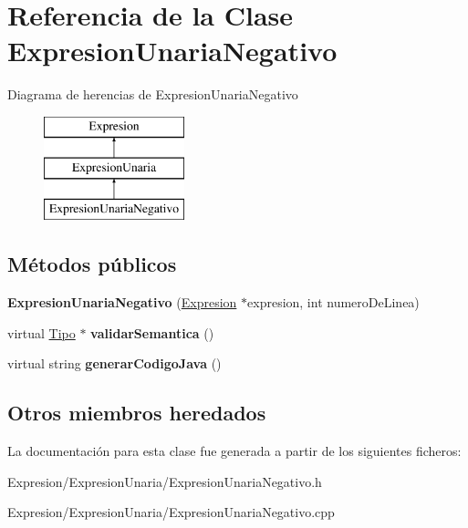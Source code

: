 \hypertarget{class_expresion_unaria_negativo}{\section{Referencia de la Clase Expresion\-Unaria\-Negativo}
\label{class_expresion_unaria_negativo}
}
Diagrama de herencias de Expresion\-Unaria\-Negativo\begin{figure}[H]
\begin{center}
\leavevmode
\includegraphics[height=3.000000cm]{class_expresion_unaria_negativo}
\end{center}
\end{figure}
\subsection*{Métodos públicos}
\begin{DoxyCompactItemize}
\item 
\hypertarget{class_expresion_unaria_negativo_a897ba7b63c8c8d6d7c5794a27dcb322b}{{\bfseries Expresion\-Unaria\-Negativo} (\hyperlink{class_expresion}{Expresion} $\ast$expresion, int numero\-De\-Linea)}\label{class_expresion_unaria_negativo_a897ba7b63c8c8d6d7c5794a27dcb322b}

\item 
\hypertarget{class_expresion_unaria_negativo_a876ebfb1a2ac9546a696078b6a18381c}{virtual \hyperlink{class_tipo}{Tipo} $\ast$ {\bfseries validar\-Semantica} ()}\label{class_expresion_unaria_negativo_a876ebfb1a2ac9546a696078b6a18381c}

\item 
\hypertarget{class_expresion_unaria_negativo_a0bfb774ec66fda7bfcb88f403026265e}{virtual string {\bfseries generar\-Codigo\-Java} ()}\label{class_expresion_unaria_negativo_a0bfb774ec66fda7bfcb88f403026265e}

\end{DoxyCompactItemize}
\subsection*{Otros miembros heredados}


La documentación para esta clase fue generada a partir de los siguientes ficheros\-:\begin{DoxyCompactItemize}
\item 
Expresion/\-Expresion\-Unaria/Expresion\-Unaria\-Negativo.\-h\item 
Expresion/\-Expresion\-Unaria/Expresion\-Unaria\-Negativo.\-cpp\end{DoxyCompactItemize}
